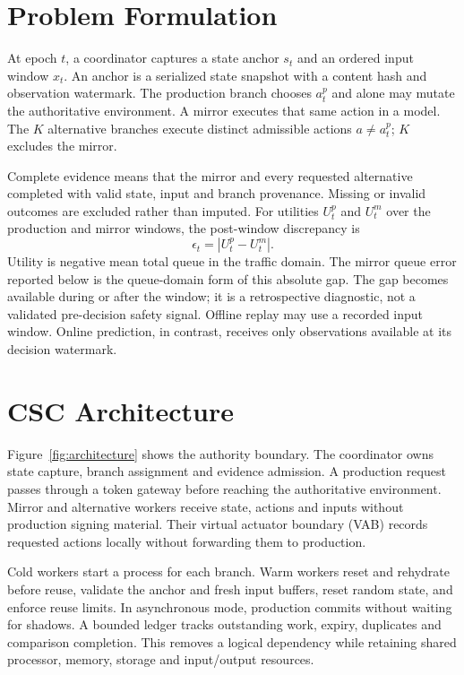 \documentclass[conference,letterpaper]{IEEEtran}
\begin{document}
\section{Problem Formulation}
At epoch $t$, a coordinator captures a state anchor $s_t$ and an ordered input
window $x_t$. An anchor is a serialized state snapshot with a content hash and
observation watermark. The production branch chooses $a_t^p$ and alone may
mutate the authoritative environment. A mirror executes that same action in a
model. The $K$ alternative branches execute distinct admissible actions
$a\ne a_t^p$; $K$ excludes the mirror.

Complete evidence means that the mirror and every requested alternative
completed with valid state, input and branch provenance. Missing or invalid
outcomes are excluded rather than imputed. For utilities $U_t^p$ and $U_t^m$
over the production and mirror windows, the post-window discrepancy is
\begin{equation}
 \epsilon_t=|U_t^p-U_t^m|.
 \label{eq:mirror-gap}
\end{equation}
Utility is negative mean total queue in the traffic domain. The mirror
queue error reported below is the queue-domain form of this absolute gap.
The gap becomes available during or after the window; it is a retrospective
diagnostic, not a validated pre-decision safety signal. Offline replay may use
a recorded input window. Online prediction, in contrast, receives only
observations available at its decision watermark.

\section{CSC Architecture}
Figure~\ref{fig:architecture} shows the authority boundary. The coordinator owns
state capture, branch assignment and evidence admission. A production request
passes through a token gateway before reaching the authoritative environment.
Mirror and alternative workers receive state, actions and inputs without
production signing material. Their virtual actuator boundary (VAB) records
requested actions locally without forwarding them to production.

Cold workers start a process for each branch. Warm workers reset and rehydrate
before reuse, validate the anchor and fresh input buffers, reset random state,
and enforce reuse limits. In asynchronous mode, production commits without
waiting for shadows. A bounded ledger tracks outstanding work, expiry,
duplicates and comparison completion. This removes a logical dependency while
retaining shared processor, memory, storage and input/output resources.
\end{document}
